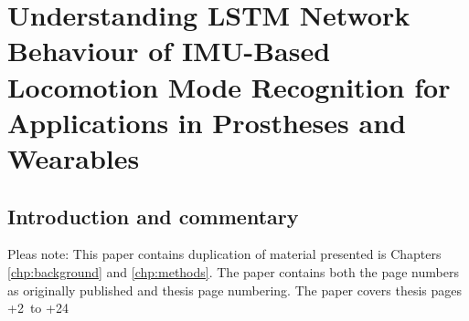 \chapter[Paper: LSTM Network Behaviour for IMU Based Locomotion Mode Recognition Systems]{Understanding LSTM Network Behaviour of IMU-Based Locomotion Mode Recognition for Applications in Prostheses and Wearables}
\label{chp:lstm-general}

\section{Introduction and commentary}
\newcommand\x{\value{page}}
Pleas note: This paper contains duplication of material presented is Chapters \ref{chp:background} and \ref{chp:methods}. The paper contains both the page numbers as originally published and thesis page numbering. The paper covers thesis pages \the\numexpr\x+2\relax \ to \the\numexpr\x+24\relax

\clearpage

